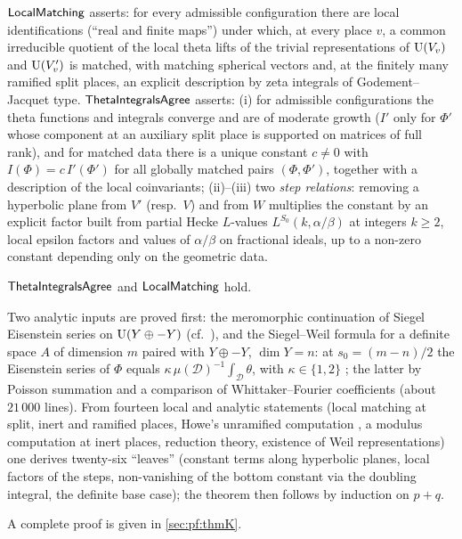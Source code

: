 \begin{definition}\label{def:families:K}
$\mathsf{LocalMatching}$ asserts: for every admissible configuration there are local identifications (``real
and finite maps'') under which, at every place $v$, a common irreducible quotient of the local theta lifts of
the trivial representations of $\operatorname{U}(V_v)$ and $\operatorname{U}(V'_v)$ is matched, with matching spherical vectors and,
at the finitely many ramified split places, an explicit description by zeta integrals of Godement--Jacquet
type. $\mathsf{ThetaIntegralsAgree}$ asserts: (i) for admissible configurations the theta functions and
integrals converge and are of moderate growth ($I'$ only for $\Phi'$ whose component at an auxiliary split
place is supported on matrices of full rank), and for matched data there is a unique constant $c\ne0$ with
$I(\Phi)=c\,I'(\Phi')$ for all globally matched pairs $(\Phi,\Phi')$, together with a description of the local
coinvariants; (ii)--(iii) two \emph{step relations}: removing a hyperbolic plane from $V'$ (resp.\ $V$) and
from $W$ multiplies the constant by an explicit factor built from partial Hecke $L$-values
$L^{S_0}(k,\alpha/\beta)$ at integers $k\ge2$, local epsilon factors and values of $\alpha/\beta$ on fractional
ideals, up to a non-zero constant depending only on the geometric data.
\end{definition}

\begin{theorem}[Theorem K]\Fmark\label{thm:theorem-K}
$\mathsf{ThetaIntegralsAgree}$ and $\mathsf{LocalMatching}$ hold.
\end{theorem}

\begin{proofoutline}
Two analytic inputs are proved first: the meromorphic continuation of Siegel Eisenstein series on
$\operatorname{U}(Y\oplus-Y)$ (cf.\ \cite{Langlands1976}), and the Siegel--Weil formula for a definite space $A$ of dimension
$m$ paired with $Y\oplus-Y$, $\dim Y=n$: at $s_0=(m-n)/2$ the Eisenstein series of $\Phi$ equals
$\kappa\,\mu(\mathcal D)^{-1}\int_{\mathcal D}\theta$, with $\kappa\in\{1,2\}$ \cite{Weil1965,KudlaRallis1988,Ichino2004};
the latter by Poisson summation and a comparison of Whittaker--Fourier coefficients (about $21\,000$ lines). From
fourteen local and analytic statements (local matching at split, inert and ramified places, Howe's unramified
computation \cite{Howe1979}, a modulus computation at inert places, reduction theory, existence of Weil
representations) one derives twenty-six ``leaves'' (constant terms along hyperbolic planes, local factors of the
steps, non-vanishing of the bottom constant via the doubling integral, the definite base case); the theorem then
follows by induction on $p+q$.

A complete proof is given in \cref{sec:pf:thmK}.
\end{proofoutline}

